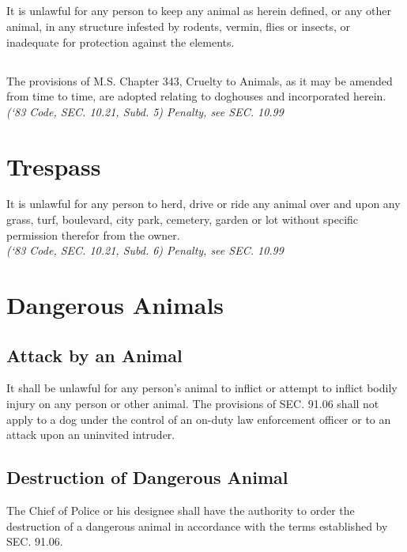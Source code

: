 \documentclass[code.tex]{subfiles}
\begin{document}
\subsection{}
It is unlawful for any person to keep any animal as herein defined, or any other animal, in any structure infested by rodents, vermin, flies or insects, or inadequate for protection against the elements.
\subsection{}
The provisions of M.S. Chapter 343, Cruelty to Animals, as it may be amended from time to time, are adopted relating to doghouses and incorporated herein.\\
\emph{(‘83 Code, SEC. 10.21, Subd. 5)  Penalty, see SEC. 10.99}

\section{Trespass}
It is unlawful for any person to herd, drive or ride any animal over and upon any grass, turf, boulevard, city park, cemetery, garden or lot without specific permission therefor from the owner.\\
\emph{(‘83 Code, SEC. 10.21, Subd. 6)  Penalty, see SEC. 10.99}

\section{Dangerous Animals}
\subsection{Attack by an Animal}
It shall be unlawful for any person’s animal to inflict or attempt to inflict bodily injury on any person or other animal. The provisions of SEC. 91.06 shall not apply to a dog under the control of an on-duty law enforcement officer or to an attack upon an uninvited intruder.
\subsection{Destruction of Dangerous Animal}
The Chief of Police or his designee shall have the authority to order the destruction of a dangerous animal in accordance with the terms established by SEC. 91.06.
\end{document}
